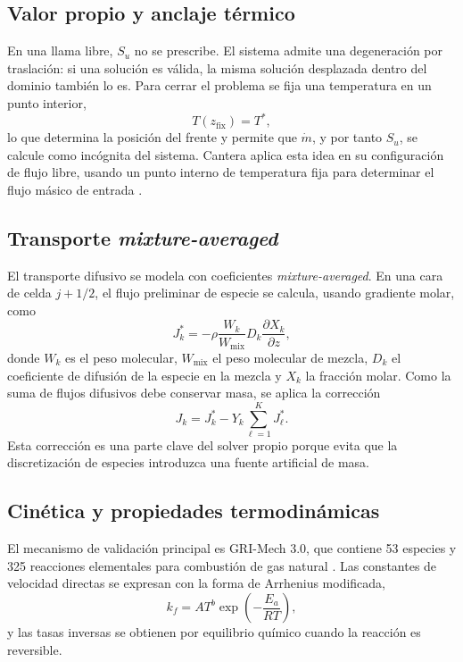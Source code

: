 \documentclass[12pt,a4paper]{article}
\begin{document}
\subsection{Valor propio y anclaje térmico}

En una llama libre, $S_u$ no se prescribe. El sistema admite una degeneración por traslación: si una solución es válida, la misma solución desplazada dentro del dominio también lo es. Para cerrar el problema se fija una temperatura en un punto interior,
\begin{equation}
  T(z_\mathrm{fix})=T^\ast,
  \label{eq:anchor}
\end{equation}
lo que determina la posición del frente y permite que $\dot{m}$, y por tanto $S_u$, se calcule como incógnita del sistema. Cantera aplica esta idea en su configuración de flujo libre, usando un punto interno de temperatura fija para determinar el flujo másico de entrada \cite{CanteraDocs31}.

\subsection{Transporte \textit{mixture-averaged}}

El transporte difusivo se modela con coeficientes \textit{mixture-averaged}. En una cara de celda $j+1/2$, el flujo preliminar de especie se calcula, usando gradiente molar, como
\begin{equation}
  J_k^\ast
  =
  -\rho
  \frac{W_k}{W_\mathrm{mix}}
  D_k
  \frac{\partial X_k}{\partial z},
  \label{eq:flux_raw}
\end{equation}
donde $W_k$ es el peso molecular, $W_\mathrm{mix}$ el peso molecular de mezcla, $D_k$ el coeficiente de difusión de la especie en la mezcla y $X_k$ la fracción molar. Como la suma de flujos difusivos debe conservar masa, se aplica la corrección
\begin{equation}
  J_k = J_k^\ast - Y_k\sum_{\ell=1}^{K}J_\ell^\ast.
  \label{eq:flux_corregido}
\end{equation}
Esta corrección es una parte clave del solver propio porque evita que la discretización de especies introduzca una fuente artificial de masa.

\subsection{Cinética y propiedades termodinámicas}

El mecanismo de validación principal es GRI-Mech 3.0, que contiene 53 especies y 325 reacciones elementales para combustión de gas natural \cite{Smith1999}. Las constantes de velocidad directas se expresan con la forma de Arrhenius modificada,
\begin{equation}
  k_f = A T^b \exp\left(-\frac{E_a}{RT}\right),
  \label{eq:arrhenius}
\end{equation}
y las tasas inversas se obtienen por equilibrio químico cuando la reacción es reversible.
\end{document}
